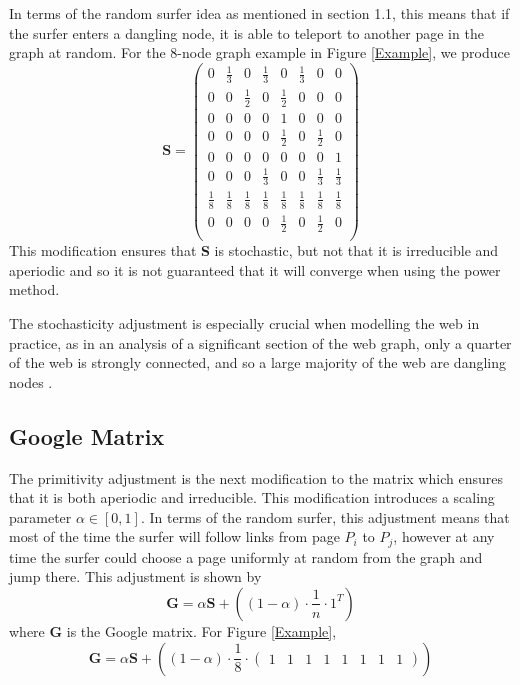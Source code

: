 \documentclass[11pt]{report}
\begin{document}
In terms of the random surfer idea as mentioned in section 1.1, this means that if the surfer enters a dangling node, it is able to teleport to another page in the graph at random. For the 8-node graph example in Figure \ref{Example}, we produce  
\[\textbf{S}=\left(
\begin{array}{cccccccc}
0 & \frac{1}{3} & 0 & \frac{1}{3} & 0 &\frac{1}{3} & 0& 0 \\
0 & 0 &\frac{1}{2}& 0 &\frac{1}{2}& 0 & 0 & 0\\
0 & 0 & 0 & 0 & 1 & 0 & 0 & 0\\
0 & 0 & 0 & 0 & \frac{1}{2} & 0 & \frac{1}{2} & 0\\
0 & 0 & 0 & 0 & 0 & 0 & 0 & 1\\
0 & 0 & 0 & \frac{1}{3} & 0 & 0 & \frac{1}{3} & \frac{1}{3} \\
\frac{1}{8} & \frac{1}{8} & \frac{1}{8} & \frac{1}{8} & \frac{1}{8} & \frac{1}{8} & \frac{1}{8} & \frac{1}{8}\\
0 & 0 & 0 & 0 & \frac{1}{2} & 0 & \frac{1}{2} & 0\\
\end{array}
\right)	\] This modification ensures that \textbf{S} is stochastic, but not that it is irreducible and aperiodic and so it is not guaranteed that it will converge when using the power method.

The stochasticity adjustment is especially crucial when modelling the web in practice, as in an analysis of a significant section of the web graph, only a quarter of the web is strongly connected, and so a large majority of the web are dangling nodes \cite{chakrabarti2002mining}.

\subsection{Google Matrix}
The primitivity adjustment is the next modification to the matrix which ensures that it is both aperiodic and irreducible. This modification introduces a scaling parameter $\alpha \in [0,1]$. In terms of the random surfer, this adjustment means that most of the time the surfer will follow links from page $P_i$ to $P_j$, however at any time the surfer could choose a page uniformly at random from the graph and jump there. This adjustment is shown by \begin{equation}\label{G}
\textbf{G}=\alpha\textbf{S}+\left((1-\alpha)\cdot\frac{1}{n}\cdot1^T\right)
\end{equation} where \textbf{G} is the Google matrix. For Figure \ref{Example},
\[\textbf{G}=\alpha\textbf{S}+\left((1-\alpha)\cdot \frac{1}{8} \cdot \left(  \begin{array}{cccccccc}
1&1&1&1&1&1&1&1\end{array}\right) \right)\]
\end{document}
